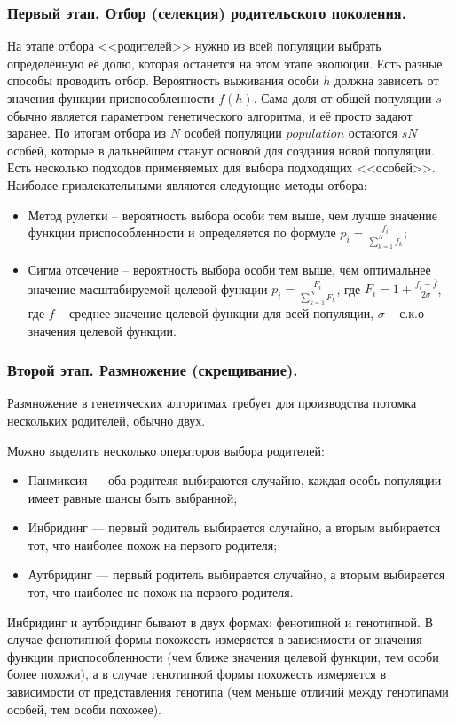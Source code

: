 \subsubsection{Первый этап. Отбор (селекция) родительского поколения.}
\noindent\indent На этапе отбора <<родителей>> нужно из всей популяции выбрать определённую её
долю, которая останется на этом этапе эволюции. Есть разные способы
проводить отбор. Вероятность выживания особи $h$ должна зависеть от значения функции
приспособленности $f(h)$. Сама доля от общей популяции $s$ обычно является параметром
генетического алгоритма, и её просто задают заранее. По итогам отбора из $N$ особей
популяции $population$ остаются $sN$ особей, которые в дальнейшем станут основой
для создания новой популяции. Есть несколько подходов применяемых для выбора
подходящих <<особей>>. Наиболее привлекательными являются следующие методы отбора:
\begin{itemize}
  \item Метод рулетки -- вероятность выбора особи тем выше, чем лучше значение
функции приспособленности и определяется по формуле $p_i = \frac{f_i}{\sum\limits_{k=1}^{N}f_k}$;
  \item Сигма отсечение -- вероятность выбора особи тем выше, чем оптимальнее
значение масштабируемой целевой функции $p_i = \frac{F_i}{\sum\limits_{k=1}^{N}F_k}$,
где $F_i = 1 + \frac{f_i - \overline{f}}{2\sigma}$, где $\overline{f}$ -- среднее
значение целевой функции для всей популяции, $\sigma$ -- с.к.о значения целевой функции.
\end{itemize}
\subsubsection{Второй этап. Размножение (скрещивание).}
\noindent\indent Размножение в генетических алгоритмах требует для производства потомка нескольких
родителей, обычно двух.\par
Можно выделить несколько операторов выбора родителей:
\begin{itemize}
  \item Панмиксия — оба родителя выбираются случайно, каждая особь популяции имеет
  равные шансы быть выбранной;
  \item Инбридинг — первый родитель выбирается случайно, а вторым выбирается тот,
  что наиболее похож на первого родителя;
  \item Аутбридинг — первый родитель выбирается случайно, а вторым выбирается тот,
  что наиболее не похож на первого родителя.
\end{itemize}\par
    Инбридинг и аутбридинг бывают в двух формах: фенотипной и генотипной. В случае
фенотипной формы похожесть измеряется в зависимости от значения функции приспособленности
(чем ближе значения целевой функции, тем особи более похожи), а в случае генотипной
формы похожесть измеряется в зависимости от представления генотипа (чем меньше
отличий между генотипами особей, тем особи похожее).

